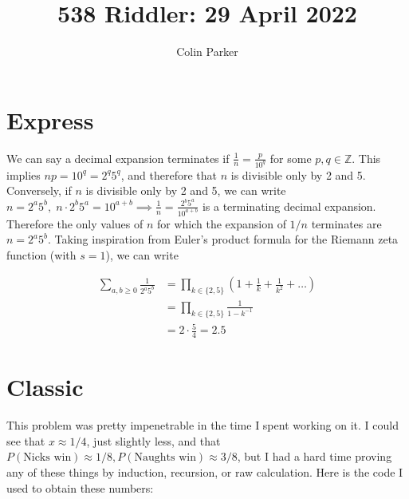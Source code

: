 \documentclass[11pt]{article} %
\title{538 Riddler: 29 April 2022}
\author{Colin Parker}
\begin{document}
\maketitle

\section{Express}

We can say a decimal expansion terminates if $\frac{1}{n} = \frac{p}{10^q}$ for some $p, q \in \mathbb{Z}$. This 
implies $np = 10^q = 2^q5^q$,
and therefore that $n$ is divisible only by 2 and 5. Conversely, if $n$ is divisible only by 2 and 5, we can write
$n = 2^a5^b, \; n \cdot 2^b5^a = 10^{a+b} \implies \frac{1}{n} = \frac{2^b5^a}{10^{a+b}}$ is a terminating decimal
expansion. Therefore the only values of $n$ for which the expansion of $1/n$ terminates are $n=2^a5^b$.
Taking inspiration from Euler's product formula for the Riemann zeta function (with $s=1$), we can write

\begin{align*}
\sum_{a, b \geq 0} \frac{1}{2^a5^b} & = \prod_{k \in \{2, 5\}}(1 + \frac{1}{k} + \frac{1}{k^2} + \ldots) \\
& = \prod_{k \in \{2, 5\}}\frac{1}{1-k^{-1}} \\
& = 2\cdot\frac{5}{4} = 2.5
\end{align*}

\section{Classic}

This problem was pretty impenetrable in the time I spent working on it. I could see that $x \approx 1/4$, just slightly
less, and that $P(\text{Nicks win}) \approx 1/8, P(\text{Naughts win}) \approx 3/8$, but I had a hard time proving
any of these things by induction, recursion, or raw calculation. Here is the code I used to obtain these numbers:
\end{document}
